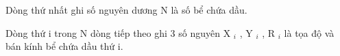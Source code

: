 Dòng thứ nhất ghi số nguyên dương N là số bể chứa dầu.  

   Dòng thứ i trong N dòng tiếp theo ghi 3 số nguyên X   $_    i   $   , Y   $_    i   $   , R   $_    i   $   là tọa độ và bán kính bể chứa dầu thứ i.  

\